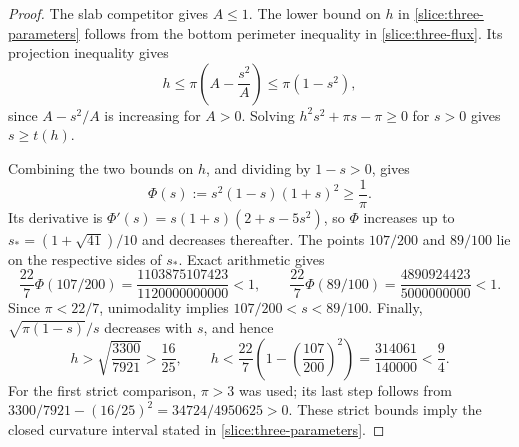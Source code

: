 \begin{proof}
The slab competitor gives $A\le1$.  The lower bound on $h$ in
\eqref{slice:three-parameters} follows from the bottom perimeter
inequality in \eqref{slice:three-flux}.  Its projection inequality
gives
\[
 h\le\pi\left(A-\frac{s^2}{A}\right)
 \le\pi(1-s^2),
\]
since $A-s^2/A$ is increasing for $A>0$.  Solving
$h^2s^2+\pi s-\pi\ge0$ for $s>0$ gives $s\ge t(h)$.

Combining the two bounds on $h$, and dividing by $1-s>0$, gives
\[
 \Phi(s):=s^2(1-s)(1+s)^2\ge\frac1\pi.
\]
Its derivative is
$\Phi'(s)=s(1+s)(2+s-5s^2)$, so $\Phi$ increases up to
$s_*=(1+\sqrt{41})/10$ and decreases thereafter.
The points $107/200$ and $89/100$ lie on the respective sides of
$s_*$.  Exact arithmetic gives
\[
 \frac{22}{7}\Phi(107/200)
 =\frac{1103875107423}{1120000000000}<1,
 \qquad
 \frac{22}{7}\Phi(89/100)
 =\frac{4890924423}{5000000000}<1.
\]
Since $\pi<22/7$, unimodality implies
$107/200<s<89/100$.
Finally, $\sqrt{\pi(1-s)}/s$ decreases with $s$, and hence
\[
 h>\sqrt{\frac{3300}{7921}}>\frac{16}{25},
 \qquad
 h<\frac{22}{7}\left(1-\left(\frac{107}{200}\right)^2\right)
 =\frac{314061}{140000}<\frac94.
\]
For the first strict comparison, $\pi>3$ was used; its last step
follows from
$3300/7921-(16/25)^2=34724/4950625>0$.
These strict bounds imply the closed curvature interval stated in
\eqref{slice:three-parameters}.
\end{proof}
